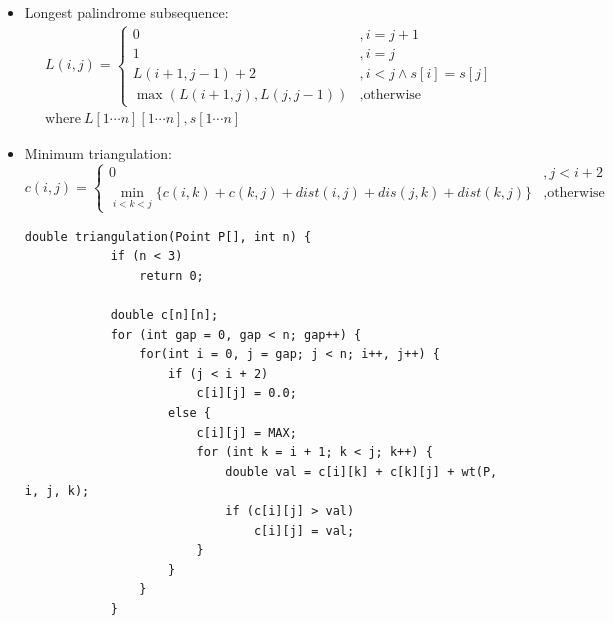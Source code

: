 \begin{itemize}
    \item Longest palindrome subsequence: \begin{equation}
        \begin{aligned}
            & L(i, j) = \begin{cases}
                0 &, i = j + 1 \\
                1 &, i = j \\
                L(i + 1, j - 1) + 2 &, i < j \land s[i] = s[j] \\
                \max(L(i + 1, j), L(j, j - 1)) &, \text{otherwise}
            \end{cases} \\
            & \text{where} \ L[1 \cdots n][1 \cdots n], s[1 \cdots n]
        \end{aligned}
    \end{equation}
    \item Minimum triangulation: \begin{equation}
        c(i, j) = \begin{cases}
            0 &, j < i + 2 \\
            \min_{i < k < j}\{c(i, k) + c(k, j) + dist(i, j) + dis(j, k) + dist(k, j)\} &, \text{otherwise}
        \end{cases}
    \end{equation} \begin{lstlisting}[caption={Minimum triangulation.}, captionpos=b]
        double triangulation(Point P[], int n) {
            if (n < 3)
                return 0;
            
            double c[n][n];
            for (int gap = 0, gap < n; gap++) {
                for(int i = 0, j = gap; j < n; i++, j++) {
                    if (j < i + 2)
                        c[i][j] = 0.0;
                    else {
                        c[i][j] = MAX;
                        for (int k = i + 1; k < j; k++) {
                            double val = c[i][k] + c[k][j] + wt(P, i, j, k);
                            if (c[i][j] > val)
                                c[i][j] = val;
                        }
                    }
                }
            }


\end{lstlisting}
\end{itemize}
